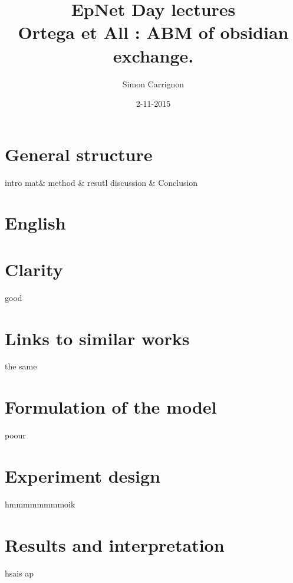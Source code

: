 \documentclass[a4paper]{article}
\title{EpNet Day lectures\\
Ortega et All : ABM of obsidian exchange.
}
\author{Simon Carrignon}
\date{2-11-2015}
\begin{document}
\maketitle

\section{General structure}
intro mat\& method \& resutl discussion \& Conclusion
\section{English}
\section{Clarity}
good
\section{Links to similar works}
the same
\section{Formulation of the model}
poour
\section{Experiment design}

hmmmmmmmmoik

\section{Results and interpretation}
hsais ap


  
\end{document}
